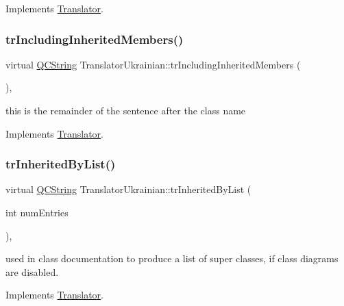 Implements \mbox{\hyperlink{class_translator}{Translator}}.

\mbox{\label{class_translator_ukrainian_aac0183cd30843a6a72f35570ffa91140}} 
\subsubsection{\texorpdfstring{trIncludingInheritedMembers()}{trIncludingInheritedMembers()}}
{\footnotesize\ttfamily virtual \mbox{\hyperlink{class_q_c_string}{Q\+C\+String}} Translator\+Ukrainian\+::tr\+Including\+Inherited\+Members (\begin{DoxyParamCaption}{ }\end{DoxyParamCaption})\hspace{0.3cm}{\ttfamily [inline]}, {\ttfamily [virtual]}}

this is the remainder of the sentence after the class name 

Implements \mbox{\hyperlink{class_translator}{Translator}}.

\mbox{\label{class_translator_ukrainian_af2149b0795b01223436fbf1860bfcce2}} 
\subsubsection{\texorpdfstring{trInheritedByList()}{trInheritedByList()}}
{\footnotesize\ttfamily virtual \mbox{\hyperlink{class_q_c_string}{Q\+C\+String}} Translator\+Ukrainian\+::tr\+Inherited\+By\+List (\begin{DoxyParamCaption}\item[{int}]{num\+Entries }\end{DoxyParamCaption})\hspace{0.3cm}{\ttfamily [inline]}, {\ttfamily [virtual]}}

used in class documentation to produce a list of super classes, if class diagrams are disabled. 

Implements \mbox{\hyperlink{class_translator}{Translator}}.

